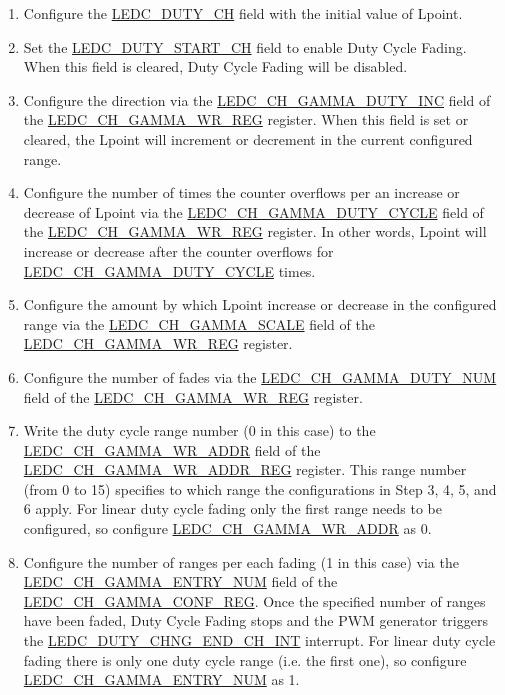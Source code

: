 \documentclass[main\_\_EN.tex]{subfiles}
\begin{document}
\begin{enumerate}
    \item Configure the \hyperref[fielddesc:LEDCDUTYCHN]{LEDC\_DUTY\_CH} field with the initial value of Lpoint.
    \item Set the \hyperref[fielddesc:LEDCDUTYSTARTCHN]{LEDC\_DUTY\_START\_CH} field to enable Duty Cycle Fading. When this field is cleared, Duty Cycle Fading will be disabled.
    \item Configure the direction via the \hyperref[fielddesc:LEDCCHNGAMMADUTYINC]{LEDC\_CH\_GAMMA\_DUTY\_INC} field of the \hyperref[regdesc:LEDCCHNGAMMAWRREG]{LEDC\_CH\_GAMMA\_WR\_REG} register. When this field is set or cleared, the Lpoint will increment or decrement in the current configured range.
    \item Configure the number of times the counter overflows per an increase or decrease of Lpoint via the \hyperref[fielddesc:LEDCCHNGAMMADUTYCYCLE]{LEDC\_CH\_GAMMA\_DUTY\_CYCLE} field of the \hyperref[regdesc:LEDCCHNGAMMAWRREG]{LEDC\_CH\_GAMMA\_WR\_REG} register. In other words, Lpoint will increase or decrease after the counter overflows for \hyperref[fielddesc:LEDCCHNGAMMADUTYCYCLE]{LEDC\_CH\_GAMMA\_DUTY\_CYCLE} times.
    \item Configure the amount by which Lpoint increase or decrease in the configured range via the \hyperref[fielddesc:LEDCCHNGAMMASCALE]{LEDC\_CH\_GAMMA\_SCALE} field of the \hyperref[regdesc:LEDCCHNGAMMAWRREG]{LEDC\_CH\_GAMMA\_WR\_REG} register.
    \item Configure the number of fades via the \hyperref[fielddesc:LEDCCHNGAMMADUTYNUM]{LEDC\_CH\_GAMMA\_DUTY\_NUM} field of the \hyperref[regdesc:LEDCCHNGAMMAWRREG]{LEDC\_CH\_GAMMA\_WR\_REG} register.
    \item Write the duty cycle range number (0 in this case) to the \hyperref[regdesc:LEDCCHNGAMMAWRADDRREG]{LEDC\_CH\_GAMMA\_WR\_ADDR} field of the \hyperref[fielddesc:LEDCCHNGAMMAWRADDR]{LEDC\_CH\_GAMMA\_WR\_ADDR\_REG} register. This range number (from 0 to 15) specifies to which range the configurations in Step 3, 4, 5, and 6 apply. For linear duty cycle fading only the first range needs to be configured, so configure  \hyperref[fielddesc:LEDCCHNGAMMAWRADDR]{LEDC\_CH\_GAMMA\_WR\_ADDR} as 0.
    \item Configure the number of ranges per each fading (1 in this case) via the \hyperref[fielddesc:LEDCCHNGAMMAENTRYNUM]{LEDC\_CH\_GAMMA\_ENTRY\_NUM} field of the \hyperref[regdesc:LEDCCHNGAMMACONFREG]{LEDC\_CH\_GAMMA\_CONF\_REG}. Once the specified number of ranges have been faded, Duty Cycle Fading stops and the PWM generator triggers the \hyperref[int:ledc-duty-chng-end]{LEDC\_DUTY\_CHNG\_END\_CH\_INT} interrupt. For linear duty cycle fading there is only one duty cycle range (i.e. the first one), so configure  \hyperref[fielddesc:LEDCCHNGAMMAENTRYNUM]{LEDC\_CH\_GAMMA\_ENTRY\_NUM} as 1.

\end{enumerate}
\end{document}
